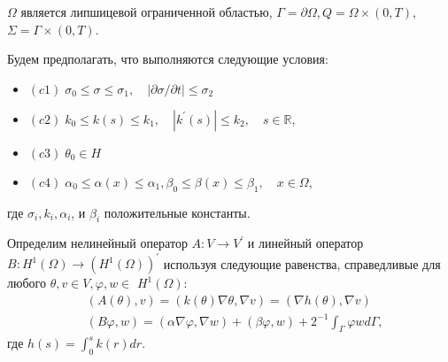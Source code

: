 \begin{frame}
    $\Omega$ является липшицевой ограниченной областью, $\Gamma=\partial \Omega, Q=\Omega \times(0, T)$, $\Sigma=\Gamma \times(0, T)$.

    Будем предполагать, что выполняются следующие условия:
    \begin{itemize}
        \item $(c1)\; \sigma_{0} \leq \sigma \leq \sigma_{1}, \quad|\partial \sigma / \partial t| \leq \sigma_{2}$

        \item $(c2)\; k_{0} \leq k(s) \leq k_{1}, \quad\left|k^{\prime}(s)\right| \leq k_{2}, \quad s \in \mathbb{R}$,

        \item $(c3)\; \theta_{0} \in H$

        \item $(c4)\; \alpha_{0} \leq \alpha(x) \leq \alpha_{1}, \beta_{0} \leq \beta(x) \leq \beta_{1}, \quad x \in \Omega$,
    \end{itemize}
    где $\sigma_{i}, k_{i}, \alpha_{i}$, и $\beta_{i}$ положительные константы.

    Определим нелинейный оператор $A: V \rightarrow V^{\prime}$ и линейный оператор
    $B: H^{1}(\Omega) \rightarrow\left(H^{1}(\Omega)\right)^{\prime}$
    используя следующие равенства, справедливые для любого
    $\theta, v \in V, \varphi, w \in$ $H^{1}(\Omega)$:
    \[
        \begin{aligned}
            &(A(\theta), v)=(k(\theta) \nabla \theta, \nabla v)=(\nabla h(\theta), \nabla v) \\
            &(B \varphi, w)=(\alpha \nabla \varphi, \nabla w)+(\beta \varphi, w)+2^{-1}
            \int_{\Gamma} \varphi w d \Gamma,
        \end{aligned}
    \]
    где $h(s)=\int_{0}^{s} k(r) d r$.
\end{frame}

